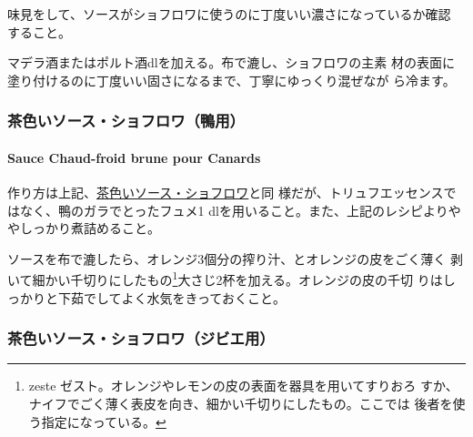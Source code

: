 \begin{recette}
味見をして、ソースがショフロワに使うのに丁度いい濃さになっているか確認
すること。

マデラ酒またはポルト酒\undemi{}dlを加える。布で漉し、ショフロワの主素
材の表面に塗り付けるのに丁度いい固さになるまで、丁寧にゆっくり混ぜなが
ら冷ます。

\maeaki

\hypertarget{ux8336ux8272ux3044ux30bdux30fcux30b9ux30b7ux30e7ux30d5ux30edux30efux9d28ux7528}{%
\subsubsection{茶色いソース・ショフロワ（鴨用）}\label{ux8336ux8272ux3044ux30bdux30fcux30b9ux30b7ux30e7ux30d5ux30edux30efux9d28ux7528}}

\hypertarget{sauce-chaud-froid-brune-pour-canards}{%
\paragraph{Sauce Chaud-froid brune pour
Canards}\label{sauce-chaud-froid-brune-pour-canards}}

  

作り方は上記、\protect\hyperlink{sauce-chaud-froid-brune}{茶色いソース・ショフロワ}と同
様だが、トリュフエッセンスではなく、鴨のガラでとったフュメ1\undemi{}
dlを用いること。また、上記のレシピよりややしっかり煮詰めること。

ソースを布で漉したら、オレンジ3個分の搾り汁、とオレンジの皮をごく薄く
剥いて細かい千切りにしたもの\footnote{zeste
  ゼスト。オレンジやレモンの皮の表面を器具を用いてすりおろ
  すか、ナイフでごく薄く表皮を向き、細かい千切りにしたもの。ここでは
  後者を使う指定になっている。}大さじ2杯を加える。オレンジの皮の千切
りはしっかりと下茹でしてよく水気をきっておくこと。

\maeaki

\hypertarget{ux8336ux8272ux3044ux30bdux30fcux30b9ux30b7ux30e7ux30d5ux30edux30efux30b8ux30d3ux30a8ux7528}{%
\subsubsection{茶色いソース・ショフロワ（ジビエ用）}\label{ux8336ux8272ux3044ux30bdux30fcux30b9ux30b7ux30e7ux30d5ux30edux30efux30b8ux30d3ux30a8ux7528}}


\end{recette}
